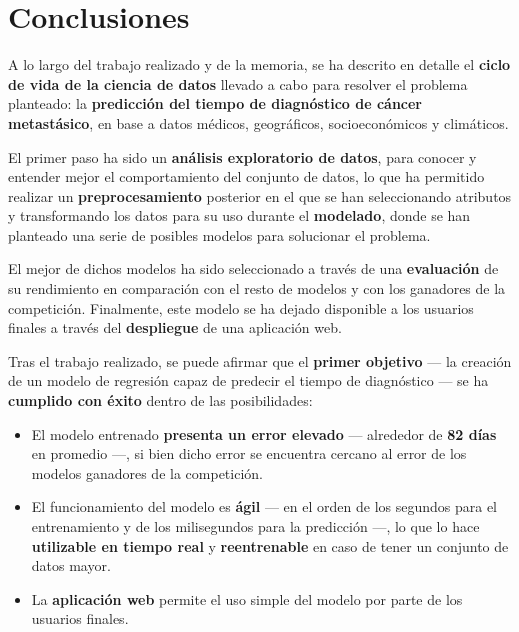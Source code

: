 \chapter{Conclusiones}

A lo largo del trabajo realizado y de la memoria, se ha descrito en detalle el \textbf{ciclo de vida de la ciencia de datos} llevado a cabo para resolver el problema planteado: la \textbf{predicción del tiempo de diagnóstico de cáncer metastásico}, en base a datos médicos, geográficos, socioeconómicos y climáticos.

El primer paso ha sido un \textbf{análisis exploratorio de datos}, para conocer y entender mejor el comportamiento del conjunto de datos, lo que ha permitido realizar un \textbf{preprocesamiento} posterior en el que se han seleccionando atributos y transformando los datos para su uso durante el \textbf{modelado}, donde se han planteado una serie de posibles modelos para solucionar el problema. 

El mejor de dichos modelos ha sido seleccionado a través de una \textbf{evaluación} de su rendimiento en comparación con el resto de modelos y con los ganadores de la competición. Finalmente, este modelo se ha dejado disponible a los usuarios finales a través del \textbf{despliegue} de una aplicación web.

Tras el trabajo realizado, se puede afirmar que el \textbf{primer objetivo} --- la creación de un modelo de regresión capaz de predecir el tiempo de diagnóstico --- se ha \textbf{cumplido con éxito} dentro de las posibilidades:
\begin{itemize}
	\item El modelo entrenado \textbf{presenta un error elevado} --- alrededor de \textbf{82 días} en promedio ---, si bien dicho error se encuentra cercano al error de los modelos ganadores de la competición.
	\item El funcionamiento del modelo es \textbf{ágil} --- en el orden de los segundos para el entrenamiento y de los milisegundos para la predicción ---, lo que lo hace \textbf{utilizable en tiempo real} y \textbf{reentrenable} en caso de tener un conjunto de datos mayor.
	\item La \textbf{aplicación web} permite el uso simple del modelo por parte de los usuarios finales.
\end{itemize}

